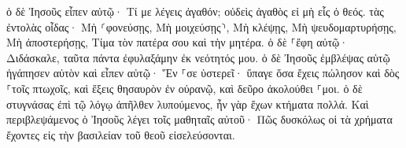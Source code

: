 \documentclass{openreader}
\begin{document}
ὁ δὲ Ἰησοῦς εἶπεν αὐτῷ· Τί με λέγεις ἀγαθόν; οὐδεὶς ἀγαθὸς εἰ μὴ εἷς ὁ θεός. 
τὰς ἐντολὰς οἶδας· Μὴ ⸂φονεύσῃς, Μὴ μοιχεύσῃς⸃, Μὴ κλέψῃς, Μὴ ψευδομαρτυρήσῃς, Μὴ ἀποστερήσῃς, Τίμα τὸν πατέρα σου καὶ τὴν μητέρα. 
ὁ δὲ ⸀ἔφη αὐτῷ· Διδάσκαλε, ταῦτα πάντα ἐφυλαξάμην ἐκ νεότητός μου. 
ὁ δὲ Ἰησοῦς ἐμβλέψας αὐτῷ ἠγάπησεν αὐτὸν καὶ εἶπεν αὐτῷ· Ἕν ⸀σε ὑστερεῖ· ὕπαγε ὅσα ἔχεις πώλησον καὶ δὸς ⸀τοῖς πτωχοῖς, καὶ ἕξεις θησαυρὸν ἐν οὐρανῷ, καὶ δεῦρο ἀκολούθει ⸀μοι. 
ὁ δὲ στυγνάσας ἐπὶ τῷ λόγῳ ἀπῆλθεν λυπούμενος, ἦν γὰρ ἔχων κτήματα πολλά. 
Καὶ περιβλεψάμενος ὁ Ἰησοῦς λέγει τοῖς μαθηταῖς αὐτοῦ· Πῶς δυσκόλως οἱ τὰ χρήματα ἔχοντες εἰς τὴν βασιλείαν τοῦ θεοῦ εἰσελεύσονται. 
\end{document}
